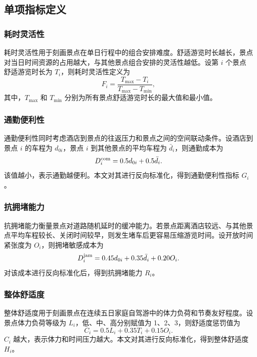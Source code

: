 \documentclass[UTF8,a4paper,12pt]{ctexart}
\begin{document}
\subsection{单项指标定义}

\subsubsection{耗时灵活性}

耗时灵活性用于刻画景点在单日行程中的组合安排难度。舒适游览时长越长，景点对当日时间资源的占用越大，与其他景点组合安排的灵活性越低。设第 $i$ 个景点舒适游览时长为 $T_i$，则耗时灵活性定义为
\begin{equation}
F_i=\frac{T_{\max}-T_i}{T_{\max}-T_{\min}},
\end{equation}
其中，$T_{\max}$ 和 $T_{\min}$ 分别为所有景点舒适游览时长的最大值和最小值。

\subsubsection{通勤便利性}

通勤便利性同时考虑酒店到景点的往返压力和景点之间的空间联动条件。设酒店到景点 $i$ 的车程为 $d_{0i}$，景点 $i$ 到其他景点的平均车程为 $\bar d_i$，则通勤成本为
\begin{equation}
D_i^{\rm com}=0.5d_{0i}+0.5\bar d_i.
\end{equation}
该值越小，表示通勤越便利。本文对其进行反向标准化，得到通勤便利性指标 $G_i$。

\subsubsection{抗拥堵能力}

抗拥堵能力衡量景点对道路随机延时的缓冲能力。若景点距离酒店较远、与其他景点平均车程较长、关闭时间较早，则发生堵车后更容易压缩游览时间。设开放时间紧张度为 $O_i$，则拥堵敏感成本为
\begin{equation}
D_i^{\rm jam}=0.45d_{0i}+0.35\bar d_i+0.20O_i.
\end{equation}
对该成本进行反向标准化后，得到抗拥堵能力 $R_i$。

\subsubsection{整体舒适度}

整体舒适度用于刻画景点在连续五日家庭自驾游中的体力负荷和节奏友好程度。设景点体力负荷等级为 $L_i$，低、中、高分别赋值为 1、2、3，则舒适度惩罚值为
\begin{equation}
C_i=0.5L_i+0.35T_i+0.15O_i.
\end{equation}
$C_i$ 越大，表示体力和时间压力越大。本文对其进行反向标准化，得到整体舒适度 $H_i$。
\end{document}
